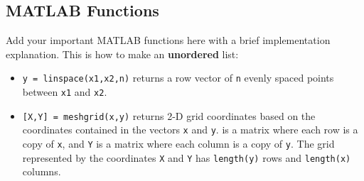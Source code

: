 \documentclass{artikel3}
\begin{document}
\begin{appendices}

    \section{MATLAB Functions}
    Add your important MATLAB functions here with a brief implementation explanation. This is how to make an \textbf{unordered} list:
    \begin{itemize}
        \item \texttt{y = linspace(x1,x2,n)} returns a row vector of \texttt{n} evenly spaced points between \texttt{x1} and \texttt{x2}.
        \item \texttt{[X,Y] = meshgrid(x,y)} returns 2-D grid coordinates based on the coordinates contained in the vectors \texttt{x} and \texttt{y}.  is a matrix where each row is a copy of \texttt{x}, and \texttt{Y} is a matrix where each column is a copy of \texttt{y}. The grid represented by the coordinates \texttt{X} and \texttt{Y} has \texttt{length(y)} rows and \texttt{length(x)} columns.
    \end{itemize}


\end{appendices}
\end{document}
